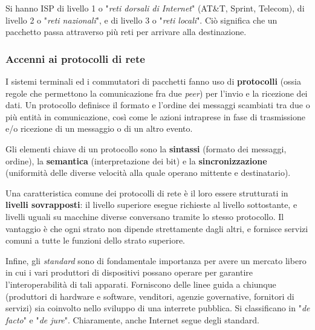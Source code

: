         \vspace{3mm}
        
        Si hanno ISP di livello 1 o "\textit{reti dorsali di Internet}" (AT\&T, Sprint, Telecom), di livello 2 o "\textit{reti nazionali}", e di livello 3 o "\textit{reti locali}". Ciò significa che un pacchetto passa attraverso più reti per arrivare alla destinazione.
    
    \subsubsection{Accenni ai protocolli di rete}
    
        I sistemi terminali ed i commutatori di pacchetti fanno uso di \textbf{protocolli} (ossia regole che permettono la comunicazione fra due \textit{peer}) per l’invio e la ricezione dei dati. Un protocollo definisce il formato e l’ordine dei messaggi scambiati tra due o più entità in comunicazione, così come le azioni intraprese in fase di trasmissione e/o ricezione di un messaggio o di un altro evento.
        
        \vspace{3mm}
        
        Gli elementi chiave di un protocollo sono la \textbf{sintassi} (formato dei messaggi, ordine), la \textbf{semantica} (interpretazione dei bit) e la \textbf{sincronizzazione} (uniformità delle diverse velocità alla quale operano mittente e destinatario).
        
        \vspace{3mm}
        
        Una caratteristica comune dei protocolli di rete è il loro essere strutturati in \textbf{livelli sovrapposti}: il livello superiore esegue richieste al livello sottostante, e livelli uguali su macchine diverse conversano tramite lo stesso protocollo. Il vantaggio è che ogni strato non dipende strettamente dagli altri, e fornisce servizi comuni a tutte le funzioni dello strato superiore. 
        
        \vspace{3mm}
        
        Infine, gli \textit{standard} sono di fondamentale importanza per avere un mercato libero in cui i vari produttori di dispositivi possano operare per garantire l’interoperabilità di tali apparati. Forniscono delle linee guida a chiunque (produttori di hardware e software, venditori, agenzie governative, fornitori di servizi) sia coinvolto nello sviluppo di una interrete pubblica. Si classificano in "\textit{de facto}" e "\textit{de jure}". Chiaramente, anche Internet segue degli standard.


